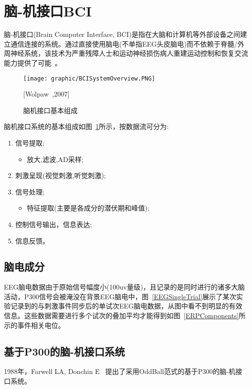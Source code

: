 \section{脑-机接口BCI}

	脑-机接口(Brain Computer Interface, BCI)是指在大脑和计算机等外部设备之间建立通信连接的系统。通过直接使用脑电(不单指EEG头皮脑电)而不依赖于脊髓/外周神经系统，该技术为严重残障人士和运动神经损伤病人重建运动控制和恢复交流能力提供了可能~\cite{Wolpaw2000}。

\begin{figure}[!hbp]
\begin{center}
\texttt{[image: graphic/BCISystemOverview.PNG]}
\caption{脑机接口基本组成 \label{BCIOverview}}
[Wolpaw~\cite{Allison2007},2007]
\end{center}
\end{figure}

脑机接口系统的基本组成如图~\ref{BCIOverview}所示，按数据流可分为:
\begin{enumerate}
\item 信号提取;
\begin{itemize}
\item	放大,滤波,AD采样;
\end{itemize}
\item 刺激呈现(视觉刺激,听觉刺激);
\item 信号处理;
\begin{itemize}
\item 特征提取(主要是各成分的潜伏期和峰值);
\end{itemize}
\item 控制信号输出，信息表达;
\item 信息反馈。
\end{enumerate}

\subsection{脑电成分}
EEG脑电数据由于原始信号幅度小(100uv量级)，且记录的是同时进行的诸多大脑活动，P300信号会被淹没在背景EEG脑电中，图~\ref{EEGSingleTrial}展示了某次实验记录到的与刺激事件同步后的单试次EEG脑电数据，从图中看不到明显的有效信息。这些数据需要进行多个试次的叠加平均才能得到如图~\ref{ERPComponents}所示的事件相关电位。

\subsection{基于P300的脑-机接口系统}
	1988年，Farwell LA, Donchin E ~\cite{FARWELL1988}提出了采用OddBall范式的基于P300的脑-机接口系统。

